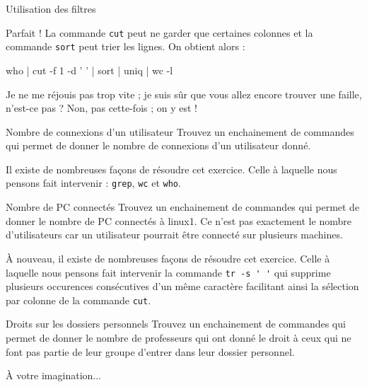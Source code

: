 \documentclass[a4paper,11pt]{article}
\begin{document}
\begin{Tutoriel}{Utilisation des filtres}
\begin{steps}
					Parfait ! La commande \verb_cut_ peut ne garder que certaines colonnes
					et la commande \verb_sort_ peut trier les lignes. On obtient alors :							
						
            \par
        					\begin{Console}
						who | cut -f 1 -d ' ' | sort | uniq | wc -l
					\end{Console}
					
					Je ne me r\'ejouis pas trop vite ; je suis s\^ur que vous allez encore
					trouver une faille, n'est-ce pas ? Non, pas cette-fois ; on y est !
			\end{steps}
		\end{Tutoriel}
\newpage				
			
		\begin{Exercice}{Nombre de connexions d'un utilisateur} 
				Trouvez un enchainement de commandes qui permet de donner le nombre de connexions
				d'un utilisateur donn\'e.
				
            \par
        
				Il existe de nombreuses fa\c cons de r\'esoudre cet exercice. 
				Celle \`a laquelle nous pensons fait intervenir : \verb_grep_, \verb_wc_ et \verb_who_.
				
            \end{Exercice}
        
			
	\begin{Exercice}{Nombre de PC connect\'es} 
			Trouvez un enchainement de commandes qui permet de donner le nombre de PC
			connect\'es \`a linux1. Ce n'est pas exactement le nombre d'utilisateurs car un utilisateur pourrait \^etre connect\'e
			sur plusieurs machines.
				
            \par
        
			\`A nouveau, il existe de nombreuses fa\c cons de r\'esoudre cet exercice. 
			Celle \`a laquelle nous pensons fait intervenir la commande \verb_tr -s ' '_
			qui supprime plusieurs occurences cons\'ecutives d'un m\^eme caract\`ere facilitant ainsi la s\'election par colonne
			de la commande \verb_cut_.
				
            \end{Exercice}
        
			
	\begin{Exercice}{Droits sur les dossiers personnels} 
			Trouvez un enchainement de commandes qui permet de donner le nombre de professeurs
			qui ont donn\'e le droit \`a ceux qui ne font pas partie de leur groupe d'entrer dans leur dossier personnel.
				
            \par
			\`A votre imagination...
				
            \end{Exercice}
   		
				
				
\end{document}
